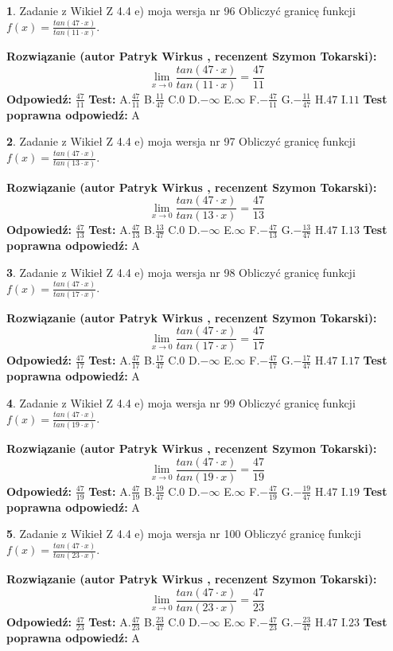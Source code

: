 \documentclass[12pt, a4paper]{article}
\theoremstyle{definition} %
\newtheorem{zad}{}
\newcommand{\zadStart}[1]{\begin{zad}#1\newline}
\newcommand{\zadStop}{\end{zad}}
\newcommand{\rozwStart}[2]{\noindent \textbf{Rozwiązanie (autor #1 , recenzent #2): }\newline}
\newcommand{\rozwStop}{\newline}
\newcommand{\odpStart}{\noindent \textbf{Odpowiedź:}\newline}
\newcommand{\odpStop}{\newline}
\newcommand{\testStart}{\noindent \textbf{Test:}\newline}
\newcommand{\testStop}{\newline}
\newcommand{\kluczStart}{\noindent \textbf{Test poprawna odpowiedź:}\newline}
\newcommand{\kluczStop}{\newline}
\begin{document}
\zadStart{Zadanie z Wikieł Z 4.4 e) moja wersja nr 96}
Obliczyć granicę funkcji $f(x)=\frac{tan(47\cdot x)}{tan(11\cdot x)}$.
\zadStop
\rozwStart{Patryk Wirkus}{Szymon Tokarski}
$$\lim\limits_{x\to 0}\frac{tan(47\cdot x)}{tan(11\cdot x)}=
\frac{47}{11}$$
\rozwStop
\odpStart
$\frac{47}{11}$
\odpStop
\testStart
A.$\frac{47}{11}$
B.$\frac{11}{47}$
C.$0$
D.$-\infty$
E.$\infty$
F.$-\frac{47}{11}$
G.$-\frac{11}{47}$
H.$47$
I.$11$
\testStop
\kluczStart
A
\kluczStop



\zadStart{Zadanie z Wikieł Z 4.4 e) moja wersja nr 97}
Obliczyć granicę funkcji $f(x)=\frac{tan(47\cdot x)}{tan(13\cdot x)}$.
\zadStop
\rozwStart{Patryk Wirkus}{Szymon Tokarski}
$$\lim\limits_{x\to 0}\frac{tan(47\cdot x)}{tan(13\cdot x)}=
\frac{47}{13}$$
\rozwStop
\odpStart
$\frac{47}{13}$
\odpStop
\testStart
A.$\frac{47}{13}$
B.$\frac{13}{47}$
C.$0$
D.$-\infty$
E.$\infty$
F.$-\frac{47}{13}$
G.$-\frac{13}{47}$
H.$47$
I.$13$
\testStop
\kluczStart
A
\kluczStop



\zadStart{Zadanie z Wikieł Z 4.4 e) moja wersja nr 98}
Obliczyć granicę funkcji $f(x)=\frac{tan(47\cdot x)}{tan(17\cdot x)}$.
\zadStop
\rozwStart{Patryk Wirkus}{Szymon Tokarski}
$$\lim\limits_{x\to 0}\frac{tan(47\cdot x)}{tan(17\cdot x)}=
\frac{47}{17}$$
\rozwStop
\odpStart
$\frac{47}{17}$
\odpStop
\testStart
A.$\frac{47}{17}$
B.$\frac{17}{47}$
C.$0$
D.$-\infty$
E.$\infty$
F.$-\frac{47}{17}$
G.$-\frac{17}{47}$
H.$47$
I.$17$
\testStop
\kluczStart
A
\kluczStop



\zadStart{Zadanie z Wikieł Z 4.4 e) moja wersja nr 99}
Obliczyć granicę funkcji $f(x)=\frac{tan(47\cdot x)}{tan(19\cdot x)}$.
\zadStop
\rozwStart{Patryk Wirkus}{Szymon Tokarski}
$$\lim\limits_{x\to 0}\frac{tan(47\cdot x)}{tan(19\cdot x)}=
\frac{47}{19}$$
\rozwStop
\odpStart
$\frac{47}{19}$
\odpStop
\testStart
A.$\frac{47}{19}$
B.$\frac{19}{47}$
C.$0$
D.$-\infty$
E.$\infty$
F.$-\frac{47}{19}$
G.$-\frac{19}{47}$
H.$47$
I.$19$
\testStop
\kluczStart
A
\kluczStop



\zadStart{Zadanie z Wikieł Z 4.4 e) moja wersja nr 100}
Obliczyć granicę funkcji $f(x)=\frac{tan(47\cdot x)}{tan(23\cdot x)}$.
\zadStop
\rozwStart{Patryk Wirkus}{Szymon Tokarski}
$$\lim\limits_{x\to 0}\frac{tan(47\cdot x)}{tan(23\cdot x)}=
\frac{47}{23}$$
\rozwStop
\odpStart
$\frac{47}{23}$
\odpStop
\testStart
A.$\frac{47}{23}$
B.$\frac{23}{47}$
C.$0$
D.$-\infty$
E.$\infty$
F.$-\frac{47}{23}$
G.$-\frac{23}{47}$
H.$47$
I.$23$
\testStop
\kluczStart
A
\kluczStop
\end{document}
